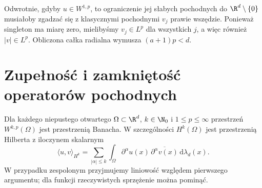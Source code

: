 \begin{przyklad}
Odwrotnie, gdyby $u\in W^{1,p}$, to ograniczenie jej
słabych pochodnych do $\R^d\setminus\{0\}$ musiałoby
zgadzać się z klasycznymi pochodnymi $v_j$ prawie
wszędzie. Ponieważ singleton ma miarę zero, mielibyśmy
$v_j\in L^p$ dla wszystkich $j$, a więc również $|v|\in L^p$.
Obliczona całka radialna wymusza $(a+1)p<d$.
\end{przyklad}

\section{Zupełność i zamkniętość operatorów pochodnych}
\label{sec:pde9-complete}

\begin{twierdzenie}
\label{thm:pde9-banach}
Dla każdego niepustego otwartego $\Omega\subset\R^d$, $k\in\N_0$ i
$1\le p\le\infty$ przestrzeń $W^{k,p}(\Omega)$ jest przestrzenią
Banacha. W szczególności $H^k(\Omega)$ jest przestrzenią Hilberta
z iloczynem skalarnym
\[
 \langle u,v\rangle_{H^k}=\sum_{|\alpha|\le k}
 \int_\Omega\partial^\alpha u(x)\,\overline{\partial^\alpha v(x)}
 \,\mathrm d\lambda_d(x).
\]
W przypadku zespolonym przyjmujemy liniowość względem
pierwszego argumentu; dla funkcji rzeczywistych sprzężenie
można pominąć.
\end{twierdzenie}
